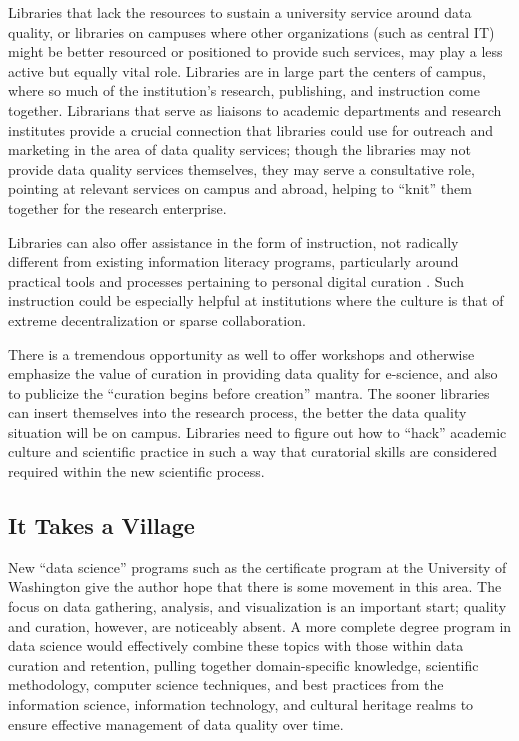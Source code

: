 \documentclass[man,12pt,biblatex]{apa6}
\begin{document}
Libraries that lack the resources to sustain a university service
around data quality, or libraries on campuses where other
organizations (such as central IT) might be better resourced or
positioned to provide such services, may play a less active but
equally vital role. Libraries are in large part the centers of campus,
where so much of the institution's research, publishing, and
instruction come together. Librarians that serve as liaisons to
academic departments and research institutes provide a crucial
connection that libraries could use for outreach and marketing in the
area of data quality services; though the libraries may not provide
data quality services themselves, they may serve a consultative role,
pointing at relevant services on campus and abroad, helping to
``knit'' them together for the research enterprise.

Libraries can also offer assistance in the form of instruction, not
radically different from existing information literacy programs,
particularly around practical tools and processes pertaining to
personal digital curation \parencite{williams:lifecycle}. Such instruction
could be especially helpful at institutions where the culture is that
of extreme decentralization or sparse collaboration.

There is a tremendous opportunity as well to offer workshops and
otherwise emphasize the value of curation in providing data quality
for e-science, and also to publicize the ``curation begins before
creation'' mantra. The sooner libraries can insert themselves into the
research process, the better the data quality situation will be on
campus. Libraries need to figure out how to ``hack'' academic culture
and scientific practice in such a way that curatorial skills are
considered required within the new scientific process.

\subsection{It Takes a Village}

New ``data science'' programs such as the certificate program at the
University of Washington \parencite{uw:datascience} give the author hope
that there is some movement in this area. The focus on data gathering,
analysis, and visualization is an important start; quality and
curation, however, are noticeably absent. A more complete degree
program in data science would effectively combine these topics with
those within data curation and retention, pulling together
domain-specific knowledge, scientific methodology, computer science
techniques, and best practices from the information science,
information technology, and cultural heritage realms to ensure
effective management of data quality over time.
\end{document}
